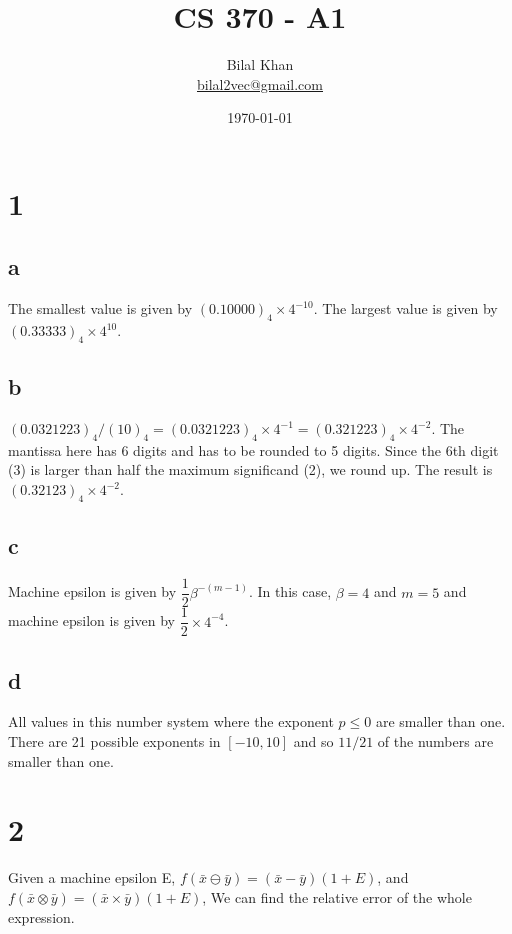 \documentclass[11pt]{article}
\title{CS 370 - A1}
\author{Bilal Khan\\
\href{mailto:bilal2vec@gmail.com}{bilal2vec@gmail.com}}
\date{\today}
\begin{document}
\maketitle

\tableofcontents

\section{1}

\subsection{a}

The smallest value is given by $(0.10000)_{4} \times 4^{-10}$. The largest value is given by $(0.33333)_{4} \times 4^{10}$.

\subsection{b}

$(0.0321223)_4 / (10)_4 = (0.0321223)_4 \times 4^{-1} = (0.321223)_4 \times 4^{-2}$. The mantissa here has 6 digits and has to be rounded to 5 digits. Since the 6th digit (3) is larger than half the maximum significand (2), we round up. The result is $(0.32123)_4 \times 4^{-2}$.

\subsection{c}

Machine epsilon is given by $\dfrac{1}{2} \beta^{-(m - 1)}$. In this case, $\beta = 4$ and $m = 5$ and machine epsilon is given by $\dfrac{1}{2} \times 4^{-4}$.

\subsection{d}

All values in this number system where the exponent $p \leq 0$ are smaller than one. There are 21 possible exponents in $[-10, 10]$ and so $11/21$ of the numbers are smaller than one.

\section{2}

Given a machine epsilon E, $f(\bar{x} \ominus \bar{y}) = (\bar{x} - \bar{y})(1 + E)$, and $f(\bar{x} \otimes \bar{y}) = (\bar{x} \times \bar{y})(1 + E)$, We can find the relative error of the whole expression.
\end{document}

